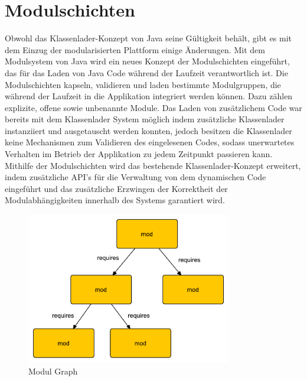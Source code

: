   \section{Modulschichten} \label{sec:module_layers}
     Obwohl das Klassenlader-Konzept von Java seine Gültigkeit behält, gibt es mit dem Einzug der modularisierten Plattform einige Änderungen.\newline 
     Mit dem Modulsystem von Java wird ein neues Konzept der Modulschichten eingeführt, das für das Laden von Java Code während der Laufzeit verantwortlich ist. Die Modulschichten kapseln, validieren und laden bestimmte Modulgruppen, die während der Laufzeit in die Applikation integriert werden können. Dazu zählen explizite, offene sowie unbenannte Module. \newline 
     Das Laden von zusätzlichem Code war bereits mit dem Klassenlader System möglich indem zusätzliche Klassenlader instanziiert und ausgetauscht werden konnten, jedoch besitzen die Klassenlader keine Mechanismen zum Validieren des eingelesenen Codes, sodass unerwartetes Verhalten im Betrieb der Applikation zu jedem Zeitpunkt passieren kann. \newline
     Mithilfe der Modulschichten wird das bestehende Klassenlader-Konzept erweitert, indem zusätzliche API's für die Verwaltung von dem dynamischen Code eingeführt und das zusätzliche Erzwingen der Korrektheit der Modulabhängigkeiten innerhalb des Systems garantiert wird.\bigbreak

    \begin{figure}[h!]
      \centering
      \includegraphics[width=0.8\textwidth]{material/images/module-graph.pdf}
      \caption{Modul Graph \cite{javaMod9}}
      \label{fig:module-graph}
    \end{figure}

